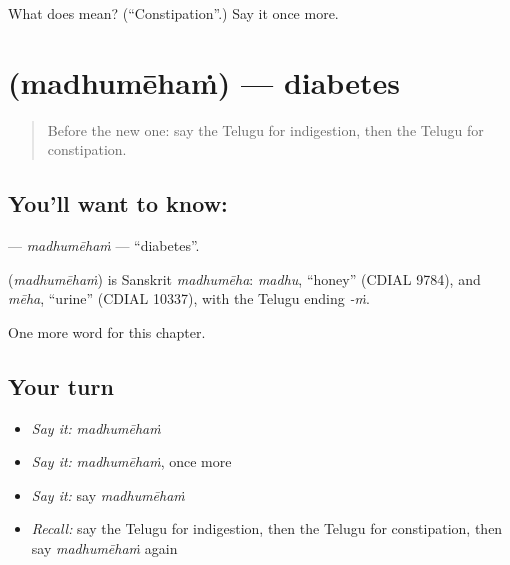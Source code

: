 \begin{tcolorbox}[breakable,colback=teal!4,colframe=teal!35!black,title={Before you move on}]
What does  mean? (\textquotedblleft{}Constipation\textquotedblright{}.) Say it once more.
\end{tcolorbox}
\section[\texorpdfstring{\te{మధుమేహం} (madhumēhaṁ)}{మధుమేహం (madhumēhaṁ)}]{ (madhumēhaṁ) — diabetes}

\label{lesson:TE-C288-madhumeham}



\begin{quote}
Before the new one: say the Telugu for indigestion, then the Telugu for constipation.
\end{quote}

\subsection*{You'll want to know: }
\textbf{} — \emph{madhumēhaṁ} — \textquotedblleft{}diabetes\textquotedblright{}.

\begin{cousinweb}
\textbf{} (\emph{madhumēhaṁ}) is Sanskrit \emph{madhumēha}: \emph{madhu}, \textquotedblleft{}honey\textquotedblright{} (CDIAL 9784), and \emph{mēha}, \textquotedblleft{}urine\textquotedblright{} (CDIAL 10337), with the Telugu ending \emph{-ṁ}.
\end{cousinweb}

\begin{grammarlens}[title={What you've built}]
One more word for this chapter.
\end{grammarlens}

\subsection*{Your turn}
\begin{itemize}
\raggedright
  \item \emph{Say it:} \emph{madhumēhaṁ}
  \item \emph{Say it:} \emph{madhumēhaṁ}, once more
  \item \emph{Say it:} say \emph{madhumēhaṁ}
  \item \emph{Recall:} say the Telugu for indigestion, then the Telugu for constipation, then say \emph{madhumēhaṁ} again
\end{itemize}

